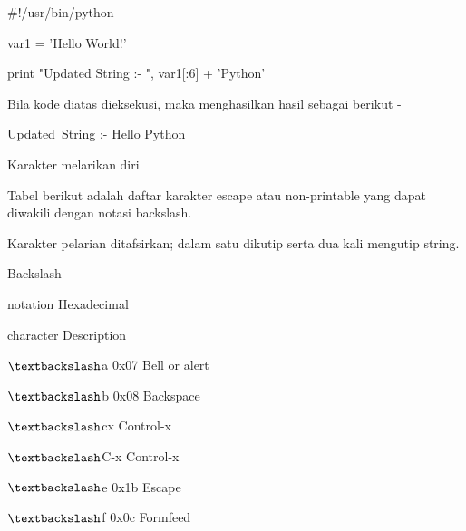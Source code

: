 \vspace{12pt}
 $  \#  $!/usr/bin/python \par
\vspace{12pt}
var1 = 'Hello World!' \par
\vspace{12pt}
print "Updated String :- ", var1[:6] + 'Python' \par
\vspace{12pt}
Bila kode diatas dieksekusi, maka menghasilkan hasil sebagai berikut - \par
\vspace{12pt}
Updated~String :-  Hello Python \par
\vspace{12pt}
Karakter melarikan diri \par
\vspace{12pt}
Tabel berikut adalah daftar karakter escape atau non-printable yang dapat diwakili dengan notasi backslash. \par
\vspace{12pt}
Karakter pelarian ditafsirkan; dalam satu dikutip serta dua kali mengutip string. \par
\vspace{12pt}
Backslash \par
notation \hspace*{0.5in} Hexadecimal \par
character \hspace*{0.5in} Description \par
 $  \textbackslash  $a \hspace*{0.5in} 0x07 \hspace*{0.5in} Bell or alert \par
 $  \textbackslash  $b \hspace*{0.5in} 0x08 \hspace*{0.5in} Backspace \par
 $  \textbackslash  $cx \hspace*{0.5in}   \hspace*{0.5in} Control-x \par
 $  \textbackslash  $C-x \hspace*{0.5in}   \hspace*{0.5in} Control-x \par
 $  \textbackslash  $e \hspace*{0.5in} 0x1b \hspace*{0.5in} Escape \par
 $  \textbackslash  $f \hspace*{0.5in} 0x0c \hspace*{0.5in} Formfeed \par
